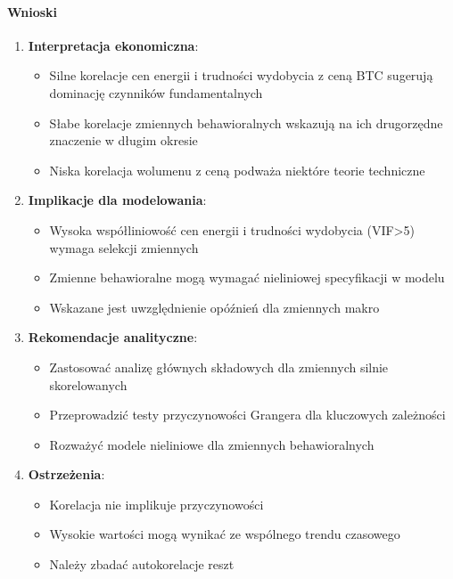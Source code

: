 \documentclass[
  11pt,
]{article}
\providecommand{\tightlist}{%
  \setlength{\itemsep}{0pt}\setlength{\parskip}{0pt}}
\begin{document}
\paragraph{Wnioski}\label{wnioski-9}

\begin{enumerate}
\def\labelenumi{\arabic{enumi}.}
\tightlist
\item
  \textbf{Interpretacja ekonomiczna}: \vspace{0.2cm}

  \begin{itemize}
  \tightlist
  \item
    Silne korelacje cen energii i trudności wydobycia z ceną BTC
    sugerują dominację czynników fundamentalnych
  \item
    Słabe korelacje zmiennych behawioralnych wskazują na ich drugorzędne
    znaczenie w długim okresie
  \item
    Niska korelacja wolumenu z ceną podważa niektóre teorie techniczne
  \end{itemize}
\item
  \textbf{Implikacje dla modelowania}: \vspace{0.2cm}

  \begin{itemize}
  \tightlist
  \item
    Wysoka współliniowość cen energii i trudności wydobycia
    (VIF\textgreater5) wymaga selekcji zmiennych
  \item
    Zmienne behawioralne mogą wymagać nieliniowej specyfikacji w modelu
  \item
    Wskazane jest uwzględnienie opóźnień dla zmiennych makro
  \end{itemize}
\item
  \textbf{Rekomendacje analityczne}: \vspace{0.2cm}

  \begin{itemize}
  \item Zastosować analizę głównych składowych dla zmiennych silnie skorelowanych
  \item Przeprowadzić testy przyczynowości Grangera dla kluczowych zależności
  \item Rozważyć modele nieliniowe dla zmiennych behawioralnych
  \end{itemize}
\item
  \textbf{Ostrzeżenia}: \vspace{0.2cm}

  \begin{itemize}
  \tightlist
  \item
    Korelacja nie implikuje przyczynowości
  \item
    Wysokie wartości mogą wynikać ze wspólnego trendu czasowego
  \item
    Należy zbadać autokorelacje reszt
  \end{itemize}
\end{enumerate}
\end{document}
